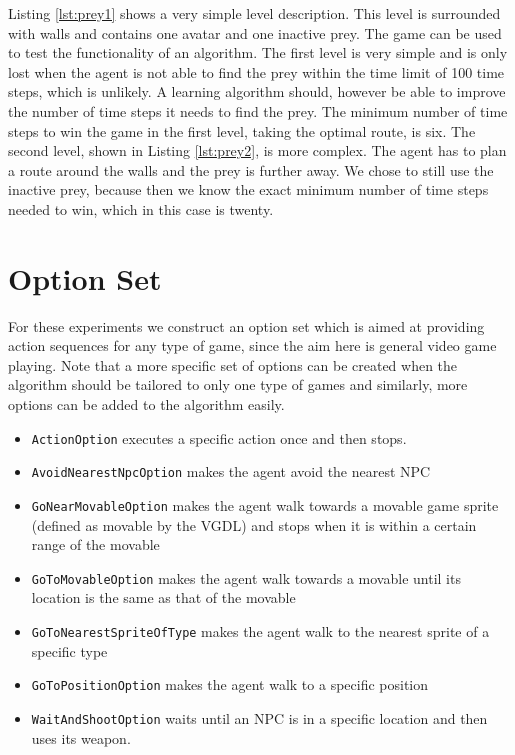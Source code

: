Listing \ref{lst:prey1} shows a very simple level description. This level is
surrounded with walls and contains one avatar and one inactive prey. 
The game can be used to test the functionality of an algorithm. The first level
is very simple and is only lost when the agent is not able to find the prey
within the time limit of 100 time steps, which is unlikely. A learning
algorithm should, however be able to improve the number of time steps it needs
to find the prey. The minimum number of time steps to win the game in the first
level, taking the optimal route, is six. The second level, shown in Listing
\ref{lst:prey2}, is more complex. The agent has to plan a route around the
walls and the prey is further away. We chose to still use the inactive prey,
because then we know the exact minimum number of time steps needed to win, which
in this case is twenty.



\section{Option Set}


For these experiments we construct an option set which is aimed at providing
action sequences for any type of game, since the aim here is general video game
playing. Note that a more specific set of options can be created when the
algorithm should be tailored to only one type of games and similarly, more
options can be added to the algorithm easily.

\begin{itemize}[noitemsep]
	\item \texttt{ActionOption} executes a specific action once and then
		stops.
	\item \texttt{AvoidNearestNpcOption} makes the agent avoid the nearest NPC
	\item \texttt{GoNearMovableOption} makes the agent walk towards a
		movable game sprite (defined as movable by the VGDL) and stops when it
		is within a certain range of the movable
	\item \texttt{GoToMovableOption} makes the agent walk towards a
		movable until its location is the same as that of the movable
	\item \texttt{GoToNearestSpriteOfType} makes the agent walk to the nearest sprite of
		a specific type
	\item \texttt{GoToPositionOption} makes the agent walk to a specific position
	\item \texttt{WaitAndShootOption} waits until an NPC is in a specific location and
		then uses its weapon.
\end{itemize}

